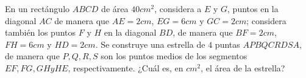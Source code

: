 En un rectángulo $ABCD$ de área $40cm^2$, considera a $E$ y $G$, puntos en la diagonal $AC$ de manera que $AE = 2cm$, $EG = 6cm$ y $GC = 2cm$; considera también los puntos $F$ y $H$ en la diagonal $BD$, de manera que $BF = 2cm$, $FH = 6cm$ y $HD = 2cm$. Se construye una estrella de $4$ puntas $APBQCRDSA$, de manera que $P, Q, R, S$ son los puntos medios de los segmentos $EF, FG, GH y HE$, respectivamente. ¿Cuál es, en $cm^2$, el área de la estrella?